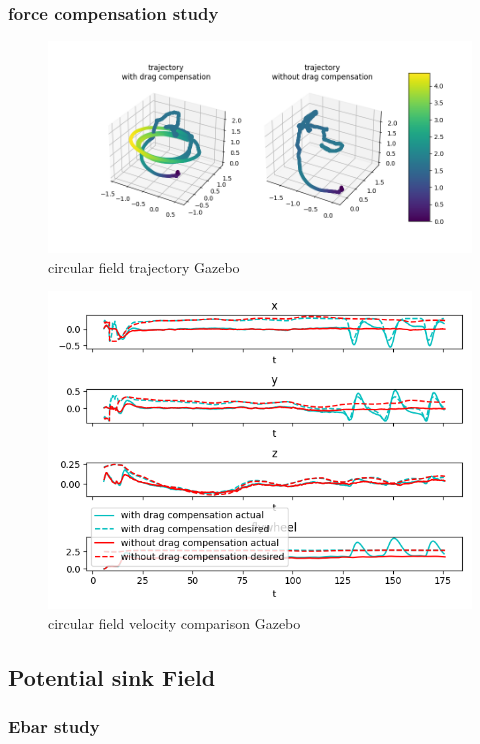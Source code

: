 \subsubsection{force compensation study}
\begin{figure}[h!]
   \centering
   \includegraphics[width=\linewidth]{Images/gazebo_trajectory_fcomp_circular.png}
   \caption{circular field trajectory Gazebo}
   \label{fig:trajgazebocircularfcomp}
\end{figure}
\begin{figure}[h!]
   \centering
   \includegraphics[width=\linewidth]{Images/gazebo_circular_fcomp_V.png}
   \caption{circular field velocity comparison Gazebo}
   \label{fig:velgazebocircularfcomp}
\end{figure}
\subsection{Potential sink Field}
\subsubsection{Ebar study}
